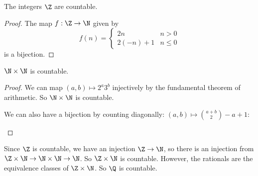\documentclass[a4paper]{article}
\begin{document}
  \begin{prop}
    The integers $\Z$ are countable.
  \end{prop}
  \begin{proof}
    The map $f: \Z\to \N$ given by
    \[
      f(n) = 
      \begin{cases}
        2n & n > 0\\
        2(-n) + 1 & n \leq 0
      \end{cases}
    \]
    is a bijection.
  \end{proof}

  \begin{prop}
    $\N \times \N$ is countable.
  \end{prop}
  \begin{proof}
    We can map $(a, b)\mapsto 2^a3^b$ injectively by the fundamental theorem of arithmetic. So $\N\times \N$ is countable.

    We can also have a bijection by counting diagonally: $(a, b) \mapsto \binom{a + b}{2} - a + 1$: 

    \begin{center}

      \usetikzlibrary{decorations.markings}

    \end{center}
  \end{proof}

  Since $\Z$ is countable, we have an injection $\Z\to \N$, so there is an injection from $\Z\times \N\to \N\times \N \to \N$. So $\Z \times \N$ is countable. However, the rationals are the equivalence classes of $\Z\times\N$. So $\Q$ is countable.
\end{document}
